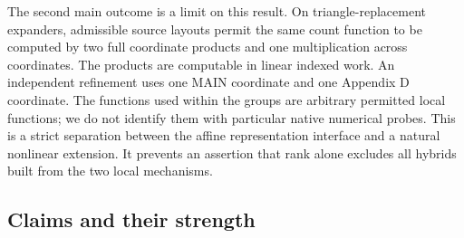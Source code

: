 \documentclass[
  11pt,
]{article}
\begin{document}
The second main outcome is a limit on this result. On
triangle-replacement expanders, admissible source layouts permit the
same count function to be computed by two full coordinate products and
one multiplication across coordinates. The products are computable in
linear indexed work. An independent refinement uses one MAIN coordinate
and one Appendix D coordinate. The functions used within the groups are
arbitrary permitted local functions; we do not identify them with
particular native numerical probes. This is a strict separation between
the affine representation interface and a natural nonlinear extension.
It prevents an assertion that rank alone excludes all hybrids built from
the two local mechanisms.

\subsection{Claims and their strength}\label{claims-and-their-strength}
\end{document}
